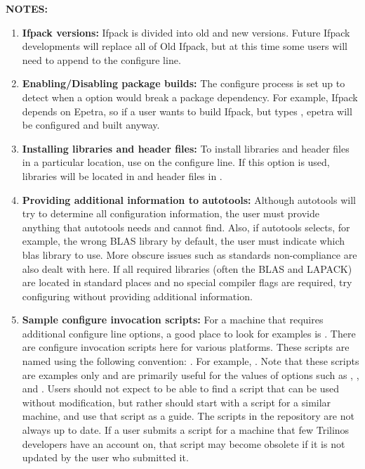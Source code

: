 \documentclass[12pt,relax]{TrilinosDevGuide}
\begin{document}
{\bf NOTES:} 
\begin{enumerate}
\item {\bf Ifpack versions:} 
Ifpack is divided into old and new versions.  Future Ifpack developments 
will replace all of Old Ifpack, but at this time some users will need to append
 to the configure line.

\item {\bf Enabling/Disabling package builds:} 
The configure process is set up to detect when a 
 option would break a package dependency.  
For example, Ifpack depends on Epetra, so if a user wants to build Ifpack, but 
types , epetra will be configured and built 
anyway.  

\item {\bf Installing libraries and header files:}
To install libraries and header files in a particular location, 
use  on the configure line.  If this option is 
used, libraries will be located in  and header files in 
.

\item {\bf Providing additional information to autotools:}
Although autotools will try to determine all configuration
information, the user must provide anything that autotools needs and 
cannot find.  Also, if autotools selects, for example, the wrong 
BLAS library by default, the user must indicate which blas library to use.  
More obscure issues such as standards 
non-compliance are also dealt with here.  If all required libraries (often 
the BLAS and LAPACK) are located in standard places and no special 
compiler flags are required, try configuring without
providing additional information.

\item {\bf Sample configure invocation scripts:}
For a machine that requires additional configure line options, a good 
place to look for examples is  \newline
{}.  There are 
configure invocation scripts here for various platforms.  These scripts are 
named using the following convention: \newline
{}.
For example, .  Note that these scripts are 
examples only and are primarily useful for the values of options such as 
, , 
and .  Users should not expect to be able to find a 
script that can be used without modification, but rather should start with a script for a similar 
machine, and use that script as a guide.  The scripts in the 
repository are not always up to date.  If a user submits a script for a 
machine that few Trilinos developers have an account on, that script may 
become obsolete if it is not updated by the user who submitted it.


\end{enumerate}
\end{document}
